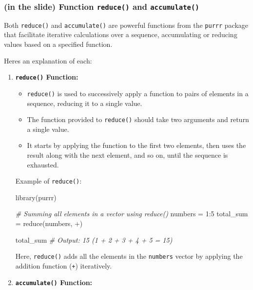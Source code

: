 \documentclass[
]{article}
\newenvironment{Shaded}{}{}
\newcommand{\AttributeTok}[1]{\textcolor[rgb]{0.49,0.56,0.16}{#1}}
\newcommand{\CommentTok}[1]{\textcolor[rgb]{0.38,0.63,0.69}{\textit{#1}}}
\newcommand{\DecValTok}[1]{\textcolor[rgb]{0.25,0.63,0.44}{#1}}
\newcommand{\FunctionTok}[1]{\textcolor[rgb]{0.02,0.16,0.49}{#1}}
\newcommand{\NormalTok}[1]{#1}
\newcommand{\OtherTok}[1]{\textcolor[rgb]{0.00,0.44,0.13}{#1}}
\newcommand{\SpecialCharTok}[1]{\textcolor[rgb]{0.25,0.44,0.63}{#1}}
\newcommand{\StringTok}[1]{\textcolor[rgb]{0.25,0.44,0.63}{#1}}
\begin{document}
\hypertarget{in-the-slide-function-reduce-and-accumulate}{%
\subsubsection{\texorpdfstring{(in the slide) Function \texttt{reduce()}
and
\texttt{accumulate()}}{(in the slide) Function reduce() and accumulate()}}\label{in-the-slide-function-reduce-and-accumulate}}

Both \texttt{reduce()} and \texttt{accumulate()} are powerful functions
from the \texttt{purrr} package that facilitate iterative calculations
over a sequence, accumulating or reducing values based on a specified
function.

Here\textquotesingle s an explanation of each:

\begin{enumerate}
\def\labelenumi{\arabic{enumi}.}
\item
  \textbf{\texttt{reduce()} Function:}

  \begin{itemize}
  \item
    \texttt{reduce()} is used to successively apply a function to pairs
    of elements in a sequence, reducing it to a single value.
  \item
    The function provided to \texttt{reduce()} should take two arguments
    and return a single value.
  \item
    It starts by applying the function to the first two elements, then
    uses the result along with the next element, and so on, until the
    sequence is exhausted.
  \end{itemize}

  Example of \texttt{reduce()}:

\begin{Shaded}
\begin{Highlighting}[]
\FunctionTok{library}\NormalTok{(purrr)}

\CommentTok{\# Summing all elements in a vector using reduce()}
\NormalTok{numbers }\OtherTok{=} \DecValTok{1}\SpecialCharTok{:}\DecValTok{5}
\NormalTok{total\_sum }\OtherTok{=} \FunctionTok{reduce}\NormalTok{(numbers, }\StringTok{\textasciigrave{}}\AttributeTok{+}\StringTok{\textasciigrave{}}\NormalTok{)}

\NormalTok{total\_sum}
\CommentTok{\# Output: 15 (1 + 2 + 3 + 4 + 5 = 15)}
\end{Highlighting}
\end{Shaded}

  Here, \texttt{reduce()} adds all the elements in the \texttt{numbers}
  vector by applying the addition function (\texttt{+}) iteratively.
\item
  \textbf{\texttt{accumulate()} Function:}


\end{enumerate}
\end{document}
